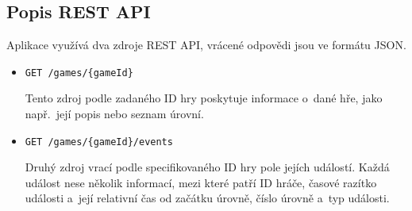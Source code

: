 \documentclass[
  digital, %
  oneside, %
  table,   %
  nolof,     %
  nolot,     %
  nocover
]{fithesis3}
\begin{document}
\subsection{Popis REST API}
Aplikace využívá dva zdroje REST API, vrácené odpovědi jsou ve formátu JSON.
\begin{itemize}
  \item \verb|GET /games/{gameId}|\par
  Tento zdroj podle zadaného ID hry poskytuje informace o~dané hře, jako např.~její popis nebo seznam úrovní.
  \item \verb|GET /games/{gameId}/events|\par
  Druhý zdroj vrací podle specifikovaného ID hry pole jejích událostí. Každá událost nese několik informací, mezi které patří ID hráče, časové razítko události a~její relativní čas od začátku úrovně, číslo úrovně a~typ události.
\end{itemize}
\end{document}
